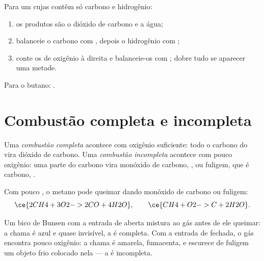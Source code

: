 \begin{method}\label{met:g8:combustion-and-fuels:write}
Para um  cujas  contêm só carbono e hidrogênio:
\begin{enumerate}
  \item os produtos são o dióxido de carbono e a água;
  \item balanceie o carbono com , depois o hidrogênio com
        ;
  \item conte os  de oxigênio à direita e balanceie-os com
        ; dobre tudo se aparecer uma metade.
\end{enumerate}
Para o butano: .
\end{method}

\section{Combustão completa e incompleta}

\begin{definition}\label{def:g8:combustion-and-fuels:complete}
Uma \emph{combustão completa} acontece com
oxigênio suficiente: todo o carbono do  vira dióxido de
carbono. Uma \emph{combustão incompleta}
acontece com pouco oxigênio: uma parte do carbono vira monóxido de
carbono, , ou fuligem, que é carbono, .
\end{definition}

\begin{example}\label{ex:g8:combustion-and-fuels:incomplete}
Com pouco , o metano pode queimar dando monóxido de carbono ou
fuligem:
\[
  \ce{2CH4 + 3O2 -> 2CO + 4H2O}, \qquad \ce{CH4 + O2 -> C + 2H2O}.
\]
\end{example}

\begin{proposition}\label{prop:g8:combustion-and-fuels:flame}
Um bico de Bunsen com a entrada de  aberta mistura  ao gás antes de
ele queimar: a chama é azul e quase invisível, a  é completa.
Com a entrada de  fechada, o gás encontra pouco oxigênio: a chama é
amarela, fumacenta, e escurece de fuligem um objeto frio colocado nela
--- a  é incompleta.
\end{proposition}

